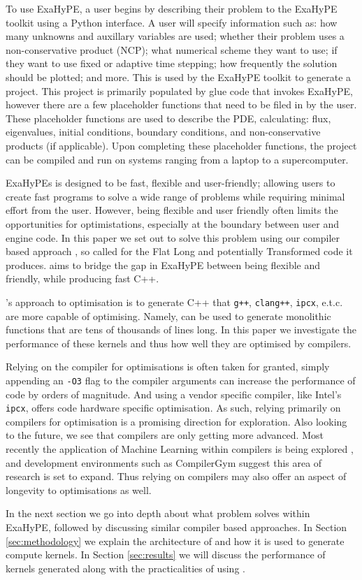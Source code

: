 To use ExaHyPE, a user begins by describing their problem to the ExaHyPE toolkit using a Python interface.
A user will specify information such as: how many unknowns and auxillary variables are used; whether their problem uses a non-conservative product (NCP); what numerical scheme they want to use; if they want to use fixed or adaptive time stepping; how frequently the solution should be plotted; and more.
This is used by the ExaHyPE toolkit to generate a project.
This project is primarily populated by glue code that invokes ExaHyPE, however there are a few placeholder functions that need to be filed in by the user.
These placeholder functions are used to describe the PDE, calculating: flux, eigenvalues, initial conditions, boundary conditions, and non-conservative products (if applicable).
Upon completing these placeholder functions, the project can be compiled and run on systems ranging from a laptop to a supercomputer.

ExaHyPEs is designed to be fast, flexible and user-friendly; allowing users to create fast programs to solve a wide range of problems while requiring minimal effort from the user.
However, being flexible and user friendly often limits the opportunities for optimistations, especially at the boundary between user and engine code.
In this paper we set out to solve this problem using our compiler based approach \phlat, so called for the Flat Long and potentially Transformed code it produces.
\phlat aims to bridge the gap in ExaHyPE between being flexible and friendly, while producing fast C++.  

\phlat{}'s approach to optimisation is to generate C++ that \texttt{g++}, \texttt{clang++}, \texttt{ipcx}, e.t.c. are more capable of optimising.  
Namely, \phlat can be used to generate monolithic functions that are tens of thousands of lines long.
In this paper we investigate the performance of these kernels and thus how well they are optimised by compilers.

Relying on the compiler for optimisations is often taken for granted, simply appending an \texttt{-O3} flag to the compiler arguments can increase the performance of code by orders of magnitude.
And using a vendor specific compiler, like Intel's \texttt{ipcx}, offers code hardware specific optimisation.
As such, relying primarily on compilers for optimisation is a promising direction for exploration.
Also looking to the future, we see that compilers are only getting more advanced.
Most recently the application of Machine Learning within compilers is being explored \cite{compiler-ml-opt,lots-of-compiler-options}, and development environments such as CompilerGym \cite{compiler-gym} suggest this area of research is set to expand.
Thus relying on compilers may also offer an aspect of longevity to optimisations as well.

In the next section we go into depth about what problem \phlat solves within ExaHyPE, followed by discussing similar compiler based approaches.
In Section \ref{sec:methodology} we explain the architecture of \phlat and how it is used to generate compute kernels.
In Section \ref{sec:results} we will discuss the performance of kernels generated along with the practicalities of using \phlat.